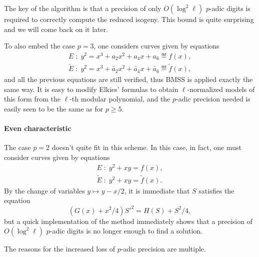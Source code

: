 \documentclass{article}
\begin{document}
The key of the algorithm is that a precision of only $O(\log^2\ell)$
$p$-adic digits is required to correctly compute the reduced
isogeny. This bound is quite surprising and we will come back on it
later.

To also embed the case $p=3$, one considers curves given by equations
\begin{equation}
\label{eq:6}
  \begin{gathered}
    E \;:\; y^2 = x^3 + a_2x^2 + a_4x + a_6 \eqdef f(x),\\
    \tilde{E} \;:\; y^2 = x^3 + \tilde{a_2}x^2 + \tilde{a_4}x + \tilde{a_6} \eqdef \tilde{f}(x),
  \end{gathered}
\end{equation}
and all the previous equations are still verified, thus BMSS is
applied exactly the same way. It is easy to modify Elkies' formulas to
obtain $\ell$-normalized models of this form from the $\ell$-th
modular polynomial, and the $p$-adic precision needed is easily seen
to be the same as for $p\ge5$.

\paragraph{Even characteristic}
The case $p=2$ doesn't quite fit in this scheme. In this case, in fact, one must
consider curves given by equations
\begin{equation}
\label{eq:6}
  \begin{gathered}
    E \;:\; y^2 + xy = f(x),\\
    \tilde{E} \;:\; y^2 + xy = \tilde{f}(x).
  \end{gathered}
\end{equation}
By the change of variables $y\mapsto y-x/2$, it is immediate that $S$
satisfies the equation
\begin{equation}
  \label{eq:7}
  (G(x) + x^2/4){S'}^2 = H(S) + S^2/4,
\end{equation}
but a quick implementation of the method immediately shows that a
precision of $O(\log^2\ell)$ $p$-adic digits is no longer enough to
find a solution.

The reasons for the increased loss of $p$-adic precision are multiple.





\end{document}
